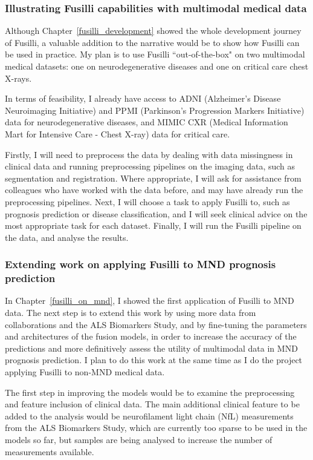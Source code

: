 \subsubsection*{Illustrating Fusilli capabilities with multimodal medical data}

Although Chapter~\ref{fusilli_development} showed the whole development journey of Fusilli, a valuable addition to the narrative would be to show how Fusilli can be used in practice.
My plan is to use Fusilli ``out-of-the-box" on two multimodal medical datasets: one on neurodegenerative diseases and one on critical care chest X-rays.

In terms of feasibility, I already have access to ADNI (Alzheimer's Disease Neuroimaging Initiative) and PPMI (Parkinson's Progression Markers Initiative) data for neurodegenerative diseases, and MIMIC CXR (Medical Information Mart for Intensive Care - Chest X-ray) data for critical care.

Firstly, I will need to preprocess the data by dealing with data missingness in clinical data and running preprocessing pipelines on the imaging data, such as segmentation and registration.
Where appropriate, I will ask for assistance from colleagues who have worked with the data before, and may have already run the preprocessing pipelines.
Next, I will choose a task to apply Fusilli to, such as prognosis prediction or disease classification, and I will seek clinical advice on the most appropriate task for each dataset.
Finally, I will run the Fusilli pipeline on the data, and analyse the results.

\subsubsection*{Extending work on applying Fusilli to MND prognosis prediction}

In Chapter~\ref{fusilli_on_mnd}, I showed the first application of Fusilli to MND data.
The next step is to extend this work by using more data from collaborations and the ALS Biomarkers Study, and by fine-tuning the parameters and architectures of the fusion models, in order to increase the accuracy of the predictions and more definitively assess the utility of multimodal data in MND prognosis prediction.
I plan to do this work at the same time as I do the project applying Fusilli to non-MND medical data.

The first step in improving the models would be to examine the preprocessing and feature inclusion of clinical data.
The main additional clinical feature to be added to the analysis would be neurofilament light chain (NfL) measurements from the ALS Biomarkers Study, which are currently too sparse to be used in the models so far, but samples are being analysed to increase the number of measurements available.

